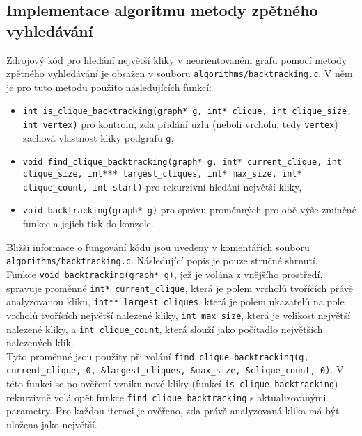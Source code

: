 \documentclass[a4paper]{article}
\begin{document}
    \subsection{Implementace algoritmu metody zpětného vyhledávání}
        Zdrojový kód pro hledání největší kliky v neorientovaném grafu pomocí metody zpětného vyhledávání je obsažen v souboru \lstinline{algorithms/backtracking.c}. V něm je pro tuto metodu použito následujících funkcí:
        \begin{itemize}
            \item \lstinline{int is_clique_backtracking(graph* g, int* clique, int clique_size, int vertex)} pro kontrolu, zda přidání uzlu (neboli vrcholu, tedy \lstinline{vertex}) zachová vlastnost kliky podgrafu \lstinline{g},
            \item \lstinline{void find_clique_backtracking(graph* g, int* current_clique, int clique_size, int*** largest_cliques, int* max_size, int* clique_count, int start)} pro rekurzivní hledání největší kliky,
            \item \lstinline{void backtracking(graph* g)} pro správu proměnných pro obě výše zmíněné funkce a jejich tisk do konzole.
        \end{itemize}

        \noindent
        Bližší informace o fungování kódu jsou uvedeny v komentářích souboru \lstinline{algorithms/backtracking.c}. Následující popis je pouze stručné shrnutí.\\

        \noindent
        Funkce \lstinline{void backtracking(graph* g)}, jež je volána z vnějšího prostředí, spravuje proměnné \lstinline{int* current_clique}, která je polem vrcholů tvořících právě analyzovanou kliku, \lstinline{int** largest_cliques}, která je polem ukazatelů na pole vrcholů tvořících největší nalezené kliky, \lstinline{int max_size}, která je velikost největší nalezené kliky, a \lstinline{int clique_count}, která slouží jako počítadlo největších nalezených klik.\\

        \noindent
        Tyto proměnné jsou použity při volání \lstinline{find_clique_backtracking(g, current_clique, 0, &largest_cliques, &max_size, &clique_count, 0)}. V této funkci se po ověření vzniku nové kliky (funkcí \lstinline{is_clique_backtracking}) rekurzivně volá opět funkce \lstinline{find_clique_backtracking} s aktualizovanými parametry. Pro každou iteraci je ověřeno, zda právě analyzovaná klika má být uložena jako největší.\\
\end{document}
